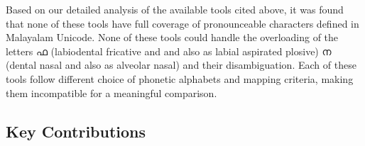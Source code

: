 \documentclass{ieeeaccess}
\begin{document}
Based on our detailed analysis of the available tools cited above, it was found that none of these tools have full coverage of pronounceable characters defined in Malayalam Unicode.  None of these tools could handle the overloading of the letters {\mal ഫ }(labiodental fricative and and also as labial aspirated plosive) {\mal ന }(dental nasal and also as alveolar nasal) and their disambiguation. Each of these tools follow different choice of phonetic alphabets and mapping criteria, making them incompatible for a meaningful comparison.




 \subsection{Key Contributions}
 
\end{document}

